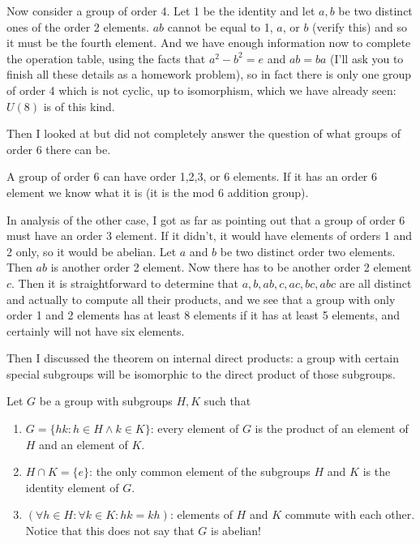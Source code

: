 \documentclass[12pt]{article}
\begin{document}
Now consider a group of order 4.  Let 1 be the identity and let $a,b$ be two distinct ones of the order 2 elements.  $ab$ cannot be equal to 1, $a$, or $b$ (verify this) and so it must be the fourth element.  And we have enough information now to complete the operation table, using the facts that $a^2-b^2=e$ and $ab=ba$ (I'll ask you to finish all these details as a homework problem), so in fact there is only one group of order 4 which is not cyclic, up to isomorphism, which we have already seen:  $U(8)$ is of this kind.

Then I looked at but did not completely answer the question of what groups of order 6 there can be.

A group of order 6 can have order 1,2,3, or 6 elements.  If it has an order 6 element we know what it is (it is the mod 6 addition group).

In analysis of the other case, I got as far as pointing out that a group of order 6 must have an order 3 element.
If it didn't, it would have elements of orders 1 and 2 only, so it would be abelian.  Let $a$ and $b$ be two distinct order two elements.  Then $ab$ is another order 2 element.  Now there has to be another order 2 element $c$.  Then it is straightforward to determine that $a,b,ab,c,ac,bc,abc$ are all distinct and actually to compute all their products, and we see that a group with only order 1 and 2 elements has at least 8 elements if it has at least 5 elements, and certainly will not have six elements.

Then I discussed the theorem on internal direct products:  a group with certain special subgroups will be isomorphic to the direct product of those subgroups.

Let $G$ be a group with subgroups $H,K$ such that 

\begin{enumerate}

\item  $G = \{hk:h \in H \wedge k \in K\}$:  every element of $G$ is the product of an element of $H$ and an element of $K$.

\item $H \cap K = \{e\}$:  the only common element of the subgroups $H$ and $K$ is the identity element of $G$.

\item $(\forall h \in H:\forall k \in K:hk=kh)$:  elements of $H$ and $K$ commute with each other.  Notice that
this does not say that $G$ is abelian!

\end{enumerate}
\end{document}
